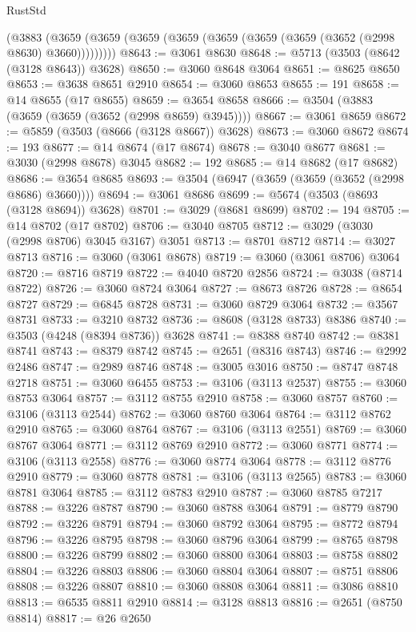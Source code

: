 \begin{lexlean}{RustStd}
\begin{coremodule}
    (@3883 (@3659 (@3659 (@3659 (@3659 (@3659 (@3659 (@3659 (@3652 (@2998 @8630) @3660)))))))))
@8643 := @3061 @8630
@8648 := @5713 (@3503 (@8642 (@3128 @8643)) @3628)
@8650 := @3060 @8648 @3064
@8651 := @8625 @8650
@8653 := @3638 @8651 @2910
@8654 := @3060 @8653
@8655 := 191
@8658 := @14 @8655 (@17 @8655)
@8659 := @3654 @8658
@8666 := @3504 (@3883 (@3659 (@3659 (@3652 (@2998 @8659) @3945))))
@8667 := @3061 @8659
@8672 := @5859 (@3503 (@8666 (@3128 @8667)) @3628)
@8673 := @3060 @8672
@8674 := 193
@8677 := @14 @8674 (@17 @8674)
@8678 := @3040 @8677
@8681 := @3030 (@2998 @8678) @3045
@8682 := 192
@8685 := @14 @8682 (@17 @8682)
@8686 := @3654 @8685
@8693 := @3504 (@6947 (@3659 (@3659 (@3652 (@2998 @8686) @3660))))
@8694 := @3061 @8686
@8699 := @5674 (@3503 (@8693 (@3128 @8694)) @3628)
@8701 := @3029 (@8681 @8699)
@8702 := 194
@8705 := @14 @8702 (@17 @8702)
@8706 := @3040 @8705
@8712 := @3029 (@3030 (@2998 @8706) @3045 @3167) @3051
@8713 := @8701 @8712
@8714 := @3027 @8713
@8716 := @3060 (@3061 @8678)
@8719 := @3060 (@3061 @8706) @3064
@8720 := @8716 @8719
@8722 := @4040 @8720 @2856
@8724 := @3038 (@8714 @8722)
@8726 := @3060 @8724 @3064
@8727 := @8673 @8726
@8728 := @8654 @8727
@8729 := @6845 @8728
@8731 := @3060 @8729 @3064
@8732 := @3567 @8731
@8733 := @3210 @8732
@8736 := @8608 (@3128 @8733) @8386
@8740 := @3503 (@4248 (@8394 @8736)) @3628
@8741 := @8388 @8740
@8742 := @8381 @8741
@8743 := @8379 @8742
@8745 := @2651 (@8316 @8743)
@8746 := @2992 @2486
@8747 := @2989 @8746
@8748 := @3005 @3016
@8750 := @8747 @8748 @2718
@8751 := @3060 @6455
@8753 := @3106 (@3113 @2537)
@8755 := @3060 @8753 @3064
@8757 := @3112 @8755 @2910
@8758 := @3060 @8757
@8760 := @3106 (@3113 @2544)
@8762 := @3060 @8760 @3064
@8764 := @3112 @8762 @2910
@8765 := @3060 @8764
@8767 := @3106 (@3113 @2551)
@8769 := @3060 @8767 @3064
@8771 := @3112 @8769 @2910
@8772 := @3060 @8771
@8774 := @3106 (@3113 @2558)
@8776 := @3060 @8774 @3064
@8778 := @3112 @8776 @2910
@8779 := @3060 @8778
@8781 := @3106 (@3113 @2565)
@8783 := @3060 @8781 @3064
@8785 := @3112 @8783 @2910
@8787 := @3060 @8785 @7217
@8788 := @3226 @8787
@8790 := @3060 @8788 @3064
@8791 := @8779 @8790
@8792 := @3226 @8791
@8794 := @3060 @8792 @3064
@8795 := @8772 @8794
@8796 := @3226 @8795
@8798 := @3060 @8796 @3064
@8799 := @8765 @8798
@8800 := @3226 @8799
@8802 := @3060 @8800 @3064
@8803 := @8758 @8802
@8804 := @3226 @8803
@8806 := @3060 @8804 @3064
@8807 := @8751 @8806
@8808 := @3226 @8807
@8810 := @3060 @8808 @3064
@8811 := @3086 @8810
@8813 := @6535 @8811 @2910
@8814 := @3128 @8813
@8816 := @2651 (@8750 @8814)
@8817 := @26 @2650

\end{coremodule}
\end{lexlean}
